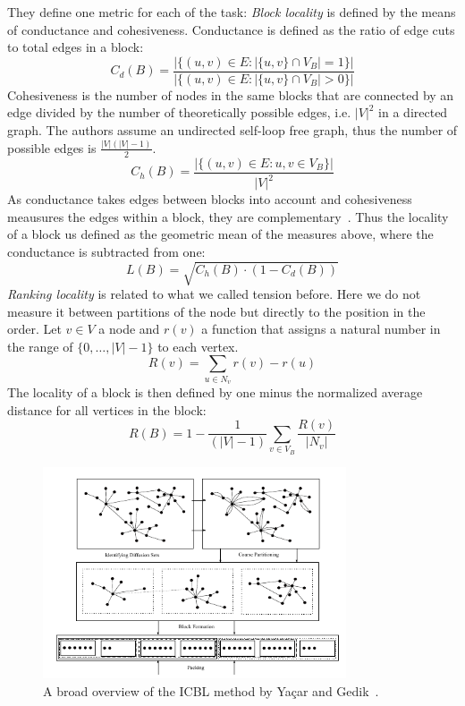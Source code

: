    They define one metric for each of the task:
    \textit{Block locality} is defined by the means of conductance and cohesiveness. 
    Conductance is defined as the ratio of edge cuts to total edges in a block:
    \[ C_d (B) = \frac{|\{ (u,v) \in E: |\{u,v\} \cap V_B| = 1\}|}{|\{ (u,v) \in E: |\{u,v\} \cap V_B| > 0\}|} \]
    Cohesiveness is the number of nodes in the same blocks that are connected by an edge divided by the number of theoretically possible edges, i.e. $|V|^2$ in a directed graph. The authors assume an undirected self-loop free graph, thus the number of possible edges is $\frac{|V| (|V| - 1)}{2}$.
    \[ C_h (B) = \frac{|\{ (u,v) \in E: u,v \in V_B \}|}{|V|^2} \]
    As conductance takes edges between blocks into account and cohesiveness meausures the edges within a block, they are complementary~\autocite{yacsar2015scalable}.
    Thus the locality of a block us defined as the geometric mean of the measures above, where the conductance is subtracted from one:
    \[ L(B) = \sqrt{C_h (B) \cdot (1 - C_d (B))} \]
    \textit{Ranking locality} is related to what we called tension before. 
    Here we do not measure it between partitions of the node but directly to the position in the order. 
    Let $v \in V$ a node and $r(v)$ a function that assigns a natural number in the range of $\{0, \dots, |V|-1\}$ to each vertex.
    \[ R (v) = \sum_{u \in N_v} r(v) - r(u) \]
    The locality of a block is then defined by one minus the normalized average distance for all vertices in the block:
    \[ R(B) = 1 - \frac{1}{(|V| - 1)} \sum_{v \in V_B} \frac{R(v)}{|N_v|} \]
    
    \begin{figure}[htp]
        \begin{center}
            \includegraphics[keepaspectratio,width=0.8\textwidth]{img/05-rel_w/icbl.png}
        \end{center}
        \caption{A broad overview of the ICBL method by Ya\c{c}ar and Gedik~\autocite{yacsar2015scalable}.} 
        \label{icbl}
    \end{figure}

